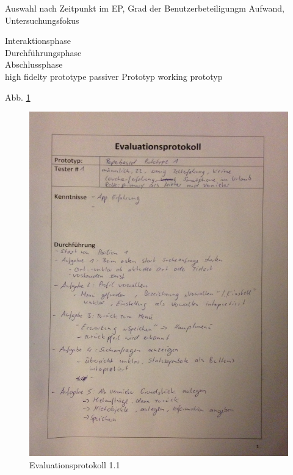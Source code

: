 Auswahl nach Zeitpunkt im EP, Grad der Benutzerbeteiligungm Aufwand, Untersuchungsfokus

Interaktionsphase\\
Durchführungsphase\\
Abschlussphase\\
high fidelty prototype
passiver Prototyp
working prototyp 

Abb. \ref{fig:evaluation11}
\begin{figure}[H]
\includegraphics[width=1\textwidth]{./images/evaluation/eva11.JPG}
\caption{Evaluationsprotokoll 1.1}
\label{fig:evaluation11}
\end{figure}

